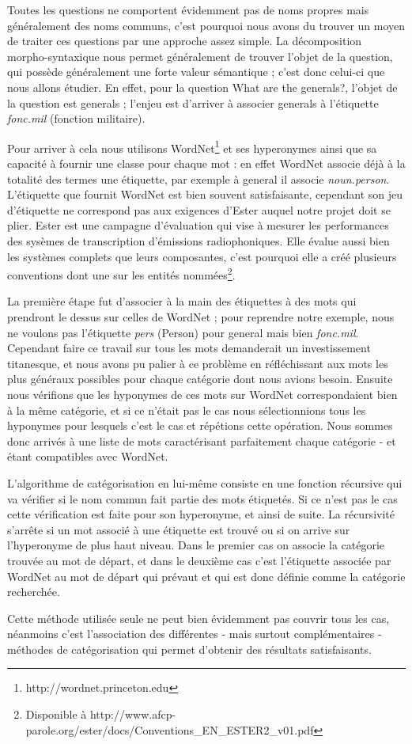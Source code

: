 \documentclass[10pt,a4paper]{article}
\begin{document}
\par Toutes les questions ne comportent évidemment pas de noms propres mais généralement des noms communs, c'est pourquoi nous avons du trouver un moyen de traiter ces questions par une approche assez simple. La décomposition morpho-syntaxique nous permet généralement de trouver l'objet de la question, qui possède généralement une forte valeur sémantique ; c'est donc celui-ci que nous allons étudier. En effet, pour la question \og{}What are the generals?\fg{}, l'objet de la question est \og{}generals\fg{} ; l'enjeu est d'arriver à associer \og{}generals\fg{} à l'étiquette \emph{fonc.mil} (fonction militaire).
\par Pour arriver à cela nous utilisons WordNet\footnote{http://wordnet.princeton.edu} et ses hyperonymes ainsi que sa capacité à fournir une classe pour chaque mot : en effet WordNet associe déjà à la totalité des termes une étiquette, par exemple à \og{}general\fg{} il associe \emph{noun.person}. L'étiquette que fournit WordNet est bien souvent satisfaisante, cependant son jeu d'étiquette ne correspond pas aux exigences d'Ester auquel notre projet doit se plier. Ester est une campagne d'évaluation qui vise à mesurer les performances des sysèmes de transcription d'émissions radiophoniques. Elle évalue aussi bien les systèmes complets que leurs composantes, c'est pourquoi elle a créé plusieurs conventions dont une sur les entités nommées\footnote{Disponible à http://www.afcp-parole.org/ester/docs/Conventions\_EN\_ESTER2\_v01.pdf}.
\par La première étape fut d'associer \og{}à la main\fg{} des étiquettes à des mots qui prendront le dessus sur celles de WordNet ; pour reprendre notre exemple, nous ne voulons pas l'étiquette \emph{pers} (Person) pour \og{}general\fg{} mais bien \emph{fonc.mil}. Cependant faire ce travail sur tous les mots demanderait un investissement titanesque, et nous avons pu palier à ce problème en réfléchissant aux mots les plus généraux possibles pour chaque catégorie dont nous avions besoin. Ensuite nous vérifions que les hyponymes de ces mots sur WordNet correspondaient bien à la même catégorie, et si ce n'était pas le cas nous sélectionnions tous les hyponymes pour lesquels c'est le cas et répétions cette opération. Nous sommes donc arrivés à une liste de mots caractérisant parfaitement chaque catégorie - et étant compatibles avec WordNet.
\par L'algorithme de catégorisation en lui-même consiste en une fonction récursive qui va vérifier si le nom commun fait partie des mots étiquetés. Si ce n'est pas le cas cette vérification est faite pour son hyperonyme, et ainsi de suite. La récursivité s'arrête si un mot associé à une étiquette est trouvé ou si on arrive sur l'hyperonyme de plus haut niveau. Dans le premier cas on associe la catégorie trouvée au mot de départ, et dans le deuxième cas c'est l'étiquette associée par WordNet au mot de départ qui prévaut et qui est donc définie comme la catégorie recherchée.
\par Cette méthode utilisée seule ne peut bien évidemment pas couvrir tous les cas, néanmoins c'est l'association des différentes - mais surtout complémentaires - méthodes de catégorisation qui permet d'obtenir des résultats satisfaisants.
\end{document}
